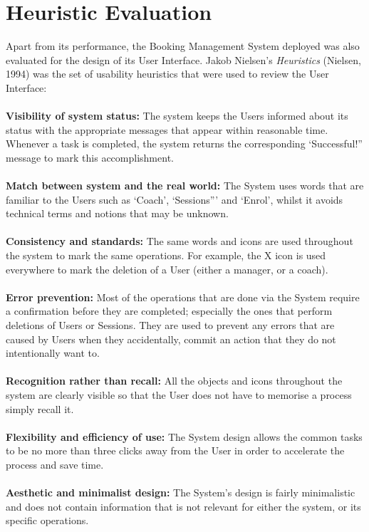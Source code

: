 \documentclass{l3proj}
\begin{document}
\section{Heuristic Evaluation}
Apart from its performance, the Booking Management System deployed was also evaluated for the design of its User Interface. Jakob Nielsen's \emph{Heuristics} (Nielsen, 1994) was the set of usability heuristics that were used to review the User Interface:\\
\\
\textbf{Visibility of system status:}
The system keeps the Users informed about its status with the appropriate messages that appear within reasonable time. Whenever a task is completed, the system returns the corresponding `Successful!” message to mark this accomplishment.\\
 \\
\textbf{Match between system and the real world:}
The System uses words that are familiar to the Users such as ‘Coach’, ‘Sessions”’ and ‘Enrol’, whilst it avoids technical terms and notions that may be unknown.\\
 \\
\textbf{Consistency and standards:}
The same words and icons are used throughout the system to mark the same operations. For example, the X icon is used everywhere to mark the deletion of a User (either a manager, or a coach).\\
 \\
\textbf{Error prevention:}
Most of the operations that are done via the System require a confirmation before they are completed; especially the ones that perform deletions of Users or Sessions. They are used to prevent any errors that are caused by Users when they accidentally, commit an action that they do not intentionally want to.\\
 \\
\textbf{Recognition rather than recall:}
All the objects and icons throughout the system are clearly visible so that the User does not have to memorise a process simply recall it.\\
 \\
\textbf{Flexibility and efficiency of use:}
The System design allows the common tasks to be no more than three clicks away from the User in order to accelerate the process and save time.\\
 \\
\textbf{Aesthetic and minimalist design:}
The System’s design is fairly minimalistic and does not contain information that is not relevant for either the system, or its specific operations.\\
\end{document}
